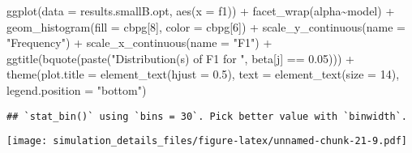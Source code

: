 \documentclass[
]{article}
\newenvironment{Shaded}{\begin{snugshade}}{\end{snugshade}}
\newcommand{\AttributeTok}[1]{\textcolor[rgb]{0.77,0.63,0.00}{#1}}
\newcommand{\DecValTok}[1]{\textcolor[rgb]{0.00,0.00,0.81}{#1}}
\newcommand{\FloatTok}[1]{\textcolor[rgb]{0.00,0.00,0.81}{#1}}
\newcommand{\FunctionTok}[1]{\textcolor[rgb]{0.00,0.00,0.00}{#1}}
\newcommand{\NormalTok}[1]{#1}
\newcommand{\SpecialCharTok}[1]{\textcolor[rgb]{0.00,0.00,0.00}{#1}}
\newcommand{\StringTok}[1]{\textcolor[rgb]{0.31,0.60,0.02}{#1}}
\begin{document}
\begin{Shaded}
\begin{Highlighting}[]
\FunctionTok{ggplot}\NormalTok{(}\AttributeTok{data =}\NormalTok{ results.smallB.opt,}
       \FunctionTok{aes}\NormalTok{(}\AttributeTok{x =}\NormalTok{ f1)) }\SpecialCharTok{+}
  \FunctionTok{facet\_wrap}\NormalTok{(alpha}\SpecialCharTok{\textasciitilde{}}\NormalTok{model) }\SpecialCharTok{+}
  \FunctionTok{geom\_histogram}\NormalTok{(}\AttributeTok{fill =}\NormalTok{ cbpg[}\DecValTok{8}\NormalTok{], }\AttributeTok{color =}\NormalTok{ cbpg[}\DecValTok{6}\NormalTok{]) }\SpecialCharTok{+}
  \FunctionTok{scale\_y\_continuous}\NormalTok{(}\AttributeTok{name =} \StringTok{"Frequency"}\NormalTok{) }\SpecialCharTok{+}
  \FunctionTok{scale\_x\_continuous}\NormalTok{(}\AttributeTok{name =} \StringTok{"F1"}\NormalTok{) }\SpecialCharTok{+}
  \FunctionTok{ggtitle}\NormalTok{(}\FunctionTok{bquote}\NormalTok{(}\FunctionTok{paste}\NormalTok{(}\StringTok{"Distribution(s) of F1 for "}\NormalTok{, beta[j] }\SpecialCharTok{==} \FloatTok{0.05}\NormalTok{))) }\SpecialCharTok{+}
  \FunctionTok{theme}\NormalTok{(}\AttributeTok{plot.title =} \FunctionTok{element\_text}\NormalTok{(}\AttributeTok{hjust =} \FloatTok{0.5}\NormalTok{), }
        \AttributeTok{text =} \FunctionTok{element\_text}\NormalTok{(}\AttributeTok{size =} \DecValTok{14}\NormalTok{),}
        \AttributeTok{legend.position =} \StringTok{"bottom"}\NormalTok{)}
\end{Highlighting}
\end{Shaded}

\begin{verbatim}
## `stat_bin()` using `bins = 30`. Pick better value with `binwidth`.
\end{verbatim}

\texttt{[image: simulation\_details\_files/figure-latex/unnamed-chunk-21-9.pdf]}
\end{document}
